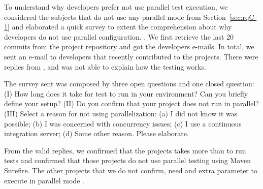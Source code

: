 To understand why developers prefer not use parallel test execution,
we considered the \numNonParallel{} subjects that do not use any
parallel mode from Section~\ref{sec:rqC-1} and elaborated a
quick survey to extent the comprehension about why developers do not
use parallel configuration. .
We first retrieve the last 20 commits from the project repository and
got the developers e-mails. In total, we sent an e-mail to
\emailsSent{} developers that recently contributed to the
\numNonParallel{} projects.
There were \emailsAnswered{} replies from \emailsProjectsAnswered{}, 
and \emailsFalseAnswers{} was not able to explain how the testing works.

The survey sent was composed by three open questions and one closed
question: (I) How long does it take for test to run in your
environment? Can you briefly define your setup? (II) Do you confirm
that your project does not run in parallel? (III) Select a reason for
not using parallelization: (a) I did not know it was possible; (b) I
was concerned with concurrency issues; (c) I use a continuous
integration server; (d) Some other reason. Please elaborate.


From the valid replies, we confirmed that the projects takes more than
 to run tests and \emailsSeq{} confirmed that those projects do not use 
parallel testing using Maven Surefire. The other projects that we do not 
confirm, need and extra parameter to execute in parallel mode .


